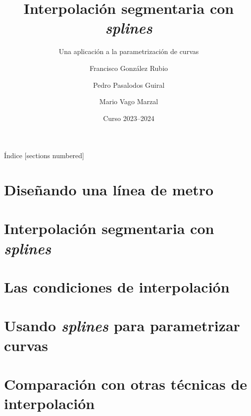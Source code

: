 \documentclass[9pt]{beamer}
\title{Interpolación segmentaria con \textit{splines}}
\subtitle{Una aplicación a la parametrización de curvas}
\author{Francisco González Rubio \and Pedro Pasalodos Guiral%
  \and Mario Vago Marzal}
\date{Curso 2023--2024}
\institute{Universitat de València}
\begin{document}
  {
    \vfuzz=16pt
    \maketitle
  }

  \begin{frame}{Índice}
    [sections numbered]
    \tableofcontents
  \end{frame}

  \section{Diseñando una línea de metro}
    

  \section{Interpolación segmentaria con \textit{splines}}

  \section{Las condiciones de interpolación}
    
    
    

  \section{Usando \textit{splines} para parametrizar curvas}

  \section{Comparación con otras técnicas de interpolación}
\end{document}
